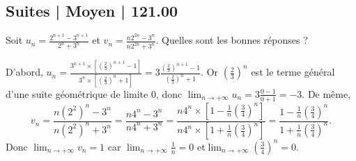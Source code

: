 \subsection{Suites | Moyen | 121.00}



\begin{question}

Soit $\displaystyle u_n=\frac{2^{n+1}-3^{n+1}}{2^n+3^n}$ et $\displaystyle v_n=\frac{n2^{2n}-3^n}{n2^{2n}+3^n}$. Quelles sont les bonnes réponses ?
\begin{answers}  
\end{answers}
\begin{explanations}
D'abord, $\displaystyle u_n=\frac{3^{n+1}\times \left[\left(\frac{2}{3}\right)^{n+1}-1\right]}{3^n\times \left[\left(\frac{2}{3}\right)^{n}+1\right]}=3\frac{\left(\frac{2}{3}\right)^{n+1}-1}{\left(\frac{2}{3}\right)^n+1}$. Or $\displaystyle \left(\frac{2}{3}\right)^n$ est le terme général d'une suite géométrique de limite $0$, donc $\displaystyle \lim _{n\to +\infty}u_n=3\frac{0-1}{0+1}=-3$. De même, 
$$\displaystyle v_n=\frac{n(2^2)^n-3^n}{n(2^2)^n+3^n}=\frac{n4^n-3^n}{n4^n+3^n}=\frac{n4^n\times \left[1-\frac{1}{n}\left(\frac{3}{4}\right)^{n}\right]}{n4^n\times \left[1+\frac{1}{n}\left(\frac{3}{4}\right)^{n}\right]}=\frac{1-\frac{1}{n}\left(\frac{3}{4}\right)^{n}}{1+\frac{1}{n}\left(\frac{3}{4}\right)^{n}}.$$
Donc $\displaystyle \lim _{n\to +\infty}v_n=1$ car $\displaystyle \lim _{n\to +\infty}\frac{1}{n}=0$ et$\displaystyle \lim _{n\to +\infty}\left(\frac{3}{4}\right)^{n}=0$.
\end{explanations}
\end{question}



